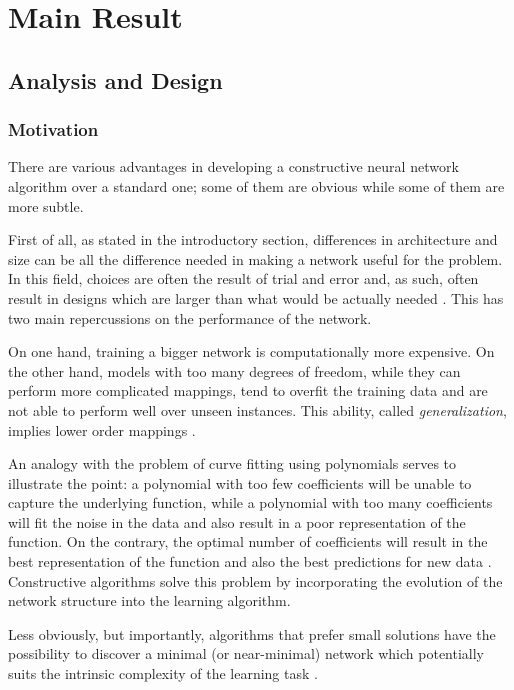 \documentclass[11pt,a4paper]{report}
\begin{document}
	
	\chapter{Main Result}
		\section{Analysis and Design}
			\subsection{Motivation}
				There are various advantages in developing a constructive neural network algorithm over a standard one; some of them are obvious while some of them are more subtle.
				
				First of all, as stated in the introductory section, differences in architecture and size can be all the difference needed in making a network useful for the problem. In this field, choices are often the result of trial and error and, as such, often result in designs which are larger than what would be actually needed \cite{?}. This has two main repercussions on the performance of the network.
				
				On one hand, training a bigger network is computationally more expensive. On the other hand, models with too many degrees of freedom, while they can perform more complicated mappings, tend to overfit the training data and are not able to perform well over unseen instances. This ability, called \emph{generalization}, implies lower order mappings \cite{alpaydin1994gal}.
				
				An analogy with the problem of curve fitting using polynomials serves to illustrate the point: a polynomial with too few coefficients will be unable to capture the underlying function, while a polynomial with too many coefficients will fit the noise in the data and also result in a poor representation of the function. On the contrary, the optimal number of coefficients will result in the best representation of the function and also the best predictions for new data \cite{kwok1997objective}. Constructive algorithms solve this problem by incorporating the evolution of the network structure into the learning algorithm.
				
				Less obviously, but importantly, algorithms that prefer small solutions have the possibility to discover a minimal (or near-minimal) network which potentially suits the intrinsic complexity of the learning task \cite{parekh2000constructive}.
\end{document}

